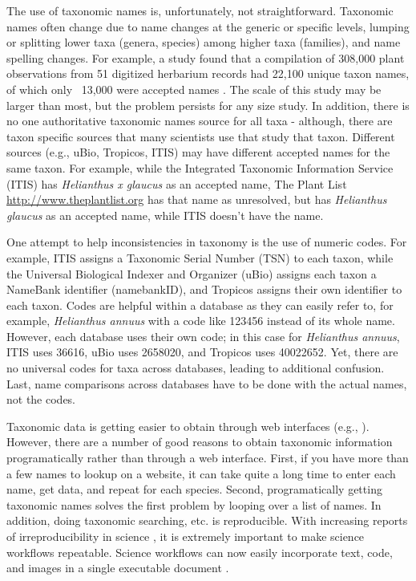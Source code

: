 \documentclass[10pt]{article}\usepackage[]{graphicx}\usepackage[]{color}
\begin{document}
The use of taxonomic names is, unfortunately, not straightforward. Taxonomic names often change due to name changes at the generic or specific levels, lumping or splitting lower taxa (genera, species) among higher taxa (families), and name spelling changes. For example, a study found that a compilation of 308,000 plant observations from 51 digitized herbarium records had 22,100 unique taxon names, of which only ~13,000 were accepted names \cite{weiser2007,boyle2013}. The scale of this study may be larger than most, but the problem persists for any size study. In addition, there is no one authoritative taxonomic names source for all taxa - although, there are taxon specific sources that many scientists use that study that taxon. Different sources (e.g., uBio, Tropicos, ITIS) may have different accepted names for the same taxon. For example, while the Integrated Taxonomic Information Service (ITIS) has \emph{Helianthus x glaucus} as an accepted name, The Plant List \url{http://www.theplantlist.org} has that name as unresolved, but has \emph{Helianthus glaucus} as an accepted name, while ITIS doesn't have the name. 

One attempt to help inconsistencies in taxonomy is the use of numeric codes. For example, ITIS assigns a Taxonomic Serial Number (TSN) to each taxon, while the Universal Biological Indexer and Organizer (uBio) assigns each taxon a NameBank identifier (namebankID), and Tropicos assigns their own identifier to each taxon. Codes are helpful within a database as they can easily refer to, for example, \emph{Helianthus annuus} with a code like 123456 instead of its whole name. However, each database uses their own code; in this case for \emph{Helianthus annuus}, ITIS uses 36616, uBio uses 2658020, and Tropicos uses 40022652. Yet, there are no universal codes for taxa across databases, leading to additional confusion. Last, name comparisons across databases have to be done with the actual names, not the codes. 

Taxonomic data is getting easier to obtain through web interfaces (e.g., \cite{eol}). However, there are a number of good reasons to obtain taxonomic information programatically rather than through a web interface. First, if you have more than a few names to lookup on a website, it can take quite a long time to enter each name, get data, and repeat for each species. Second, programatically getting taxonomic names solves the first problem by looping over a list of names. In addition, doing taxonomic searching, etc. is reproducible. With increasing reports of irreproducibility in science \cite{stodden2010,zimmer2012}, it is extremely important to make science workflows repeatable. Science workflows can now easily incorporate text, code, and images in a single executable document \cite{yihui2013}. 
\end{document}
